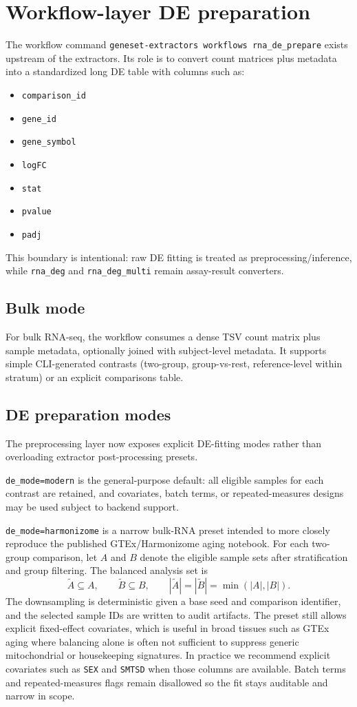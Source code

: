 \documentclass[11pt]{article}
\begin{document}
\section{Workflow-layer DE preparation}
The workflow command \texttt{geneset-extractors workflows rna\_de\_prepare} exists upstream of the extractors.
Its role is to convert count matrices plus metadata into a standardized long DE table with columns such as:
\begin{itemize}[leftmargin=2em]
\item \texttt{comparison\_id}
\item \texttt{gene\_id}
\item \texttt{gene\_symbol}
\item \texttt{logFC}
\item \texttt{stat}
\item \texttt{pvalue}
\item \texttt{padj}
\end{itemize}
This boundary is intentional: raw DE fitting is treated as preprocessing/inference, while \texttt{rna\_deg} and \texttt{rna\_deg\_multi} remain assay-result converters.

\subsection*{Bulk mode}
For bulk RNA-seq, the workflow consumes a dense TSV count matrix plus sample metadata, optionally joined with subject-level metadata.
It supports simple CLI-generated contrasts (two-group, group-vs-rest, reference-level within stratum) or an explicit comparisons table.

\subsection*{DE preparation modes}
The preprocessing layer now exposes explicit DE-fitting modes rather than overloading extractor post-processing presets.

\texttt{de\_mode=modern} is the general-purpose default: all eligible samples for each contrast are retained, and covariates, batch terms, or repeated-measures designs may be used subject to backend support.

\texttt{de\_mode=harmonizome} is a narrow bulk-RNA preset intended to more closely reproduce the published GTEx/Harmonizome aging notebook. For each two-group comparison, let $A$ and $B$ denote the eligible sample sets after stratification and group filtering. The balanced analysis set is
\[
\tilde{A} \subseteq A,\qquad \tilde{B} \subseteq B,\qquad |\tilde{A}| = |\tilde{B}| = \min(|A|, |B|).
\]
The downsampling is deterministic given a base seed and comparison identifier, and the selected sample IDs are written to audit artifacts. The preset still allows explicit fixed-effect covariates, which is useful in broad tissues such as GTEx aging where balancing alone is often not sufficient to suppress generic mitochondrial or housekeeping signatures. In practice we recommend explicit covariates such as \texttt{SEX} and \texttt{SMTSD} when those columns are available. Batch terms and repeated-measures flags remain disallowed so the fit stays auditable and narrow in scope.
\end{document}
